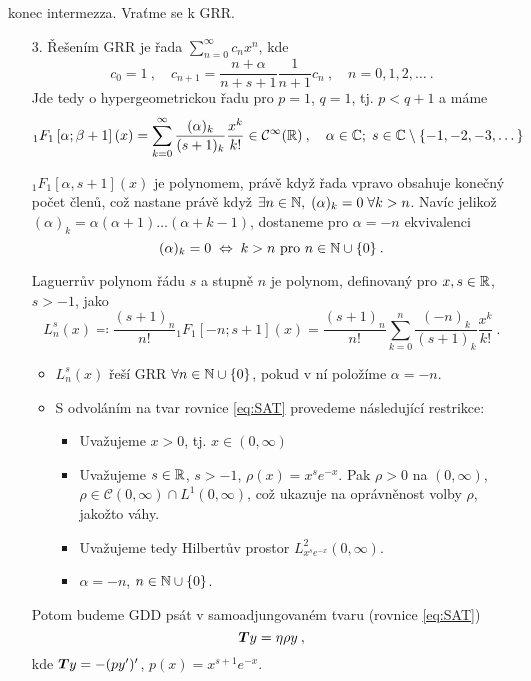 konec intermezza. Vraťme se k GRR.


\hrulefill


\begin{itemize}
    \item[3.] Řešením GRR je řada $\sum_{n=0}^\infty c_nx^n$, kde $$c_0=1\:,\quad c_{n+1} = \frac{n+\alpha}{n+s+1}\frac{1}{n+1}c_n\:,\quad n=0,1,2,\dots\:.$$
    Jde tedy o hypergeometrickou řadu pro $p=1$, $q=1$, tj. $p<q+1$ a máme
    $${}_1F_1\left[\alpha;\beta+1\right](x) = \sum\limits_{k=0}^\infty\frac{(\alpha)_k}{(s+1)_k}\frac{x^k}{k!}\in\mathcal{C}^\infty(\mathbb{R})\:,\quad \alpha\in\mathbb{C};\;s\in\mathbb{C}\setminus\{-1,-2,-3,\dots\}$$
    
${}_1F_1[\alpha,s+1](x)$ je polynomem, právě když řada vpravo obsahuje konečný počet členů, což nastane právě když $\exists n\in\mathbb{N},\; (\alpha)_k=0\;\forall k>n$.
Navíc jelikož $(\alpha)_k = \alpha(\alpha+1)\dots(\alpha+k-1)$, dostaneme pro $\alpha=-n$ ekvivalenci
$$(\alpha)_k=0\;\Leftrightarrow\;k>n \text{ pro } n\in\mathbb{N}\cup\{0\}\:.$$
\begin{definition}
    Laguerrův polynom řádu $s$ a stupně $n$ je polynom, definovaný pro $x,s\in\mathbb{R}$, $s>-1$, jako
    $$\boxed{L^s_n(x)\eqqcolon \frac{(s+1)_n}{n!}{}_1F_1[-n;s+1](x) = \frac{(s+1)_n}{n!}\sum\limits_{k=0}^n\frac{(-n)_k}{(s+1)_k}\frac{x^k}{k!}\:.}$$
\end{definition}

\begin{remark}\qquad\qquad\qquad\qquad

    \begin{itemize}
        \item $L_n^s(x)$ řeší GRR $\forall n\in\mathbb{N}\cup\{0\}$, pokud v ní položíme $\alpha=-n$.
        \item S odvoláním na tvar rovnice \ref{eq:SAT} provedeme následující restrikce:
        \begin{itemize}[\textbullet]
            \item Uvažujeme $x>0$, tj. $x\in (0,\infty)$
            \item Uvažujeme $s\in \mathbb{R}$, $s>-1$, $\rho(x)=x^se^{-x}$. Pak $\rho>0$ na $(0,\infty)$, $\rho\in\mathcal{C}(0,\infty)\cap L^1(0,\infty)$, což ukazuje na oprávněnost volby $\rho$, jakožto váhy.
            \item Uvažujeme tedy Hilbertův prostor $L^2_{x^se^{-x}}(0,\infty)$.
            \item $\alpha=-n$, $n\in\mathbb{N}\cup\{0\}$.
        \end{itemize}
    \end{itemize}
    Potom budeme GDD psát v samoadjungovaném tvaru (rovnice \ref{eq:SAT})
    $$\boldsymbol{T}y = \eta \rho y\:,$$
    kde $\boldsymbol{T}y=-(py')'$, $p(x)=x^{s+1}e^{-x}$.
    

\end{remark}
\end{itemize}
